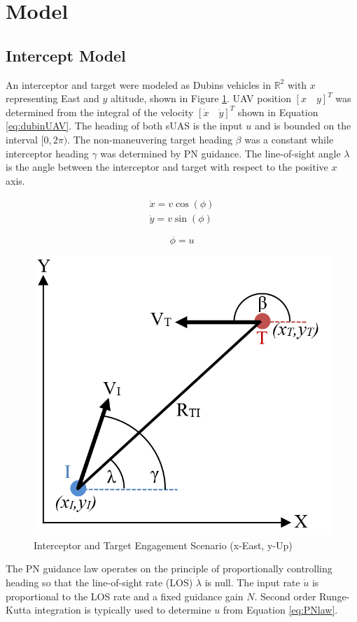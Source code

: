 \documentclass[conference]{IEEEtran}
\begin{document}
\section{Model}

\subsection{Intercept Model}
An interceptor and target were modeled as Dubins vehicles in $\mathbb{R}^2$ with $x$ representing East and $y$ altitude, shown in Figure \ref{fig:Egagement}. UAV position $[x \quad y]^T$ was determined from the integral of the velocity $[\dot{x} \quad \dot{y}]^T$ shown in Equation \ref{eq:dubinUAV}. The heading of both sUAS is the input $u$ and is bounded on the interval $[0,2\pi)$. The non-maneuvering target heading $\beta$ was a constant while interceptor heading $\gamma$ was determined by PN guidance. The line-of-sight angle $\lambda$ is the angle between the interceptor and target with respect to the positive $x$ axis. 



\begin{equation} \label{eq:dubinUAV}
\begin{split}
\dot{x} = v\cos(\phi)\\
\dot{y} = v\sin(\phi)
\end{split}
\end{equation}

\begin{equation}\label{eq:dubinsVel}
\phi = u
\end{equation}
 

\begin{figure}[H]
	\centering
	\includegraphics[width=6 cm]{Engagement_Model.PNG}
	\caption{Interceptor and Target Engagement Scenario (x-East, y-Up)}
	\label{fig:Egagement}
\end{figure}

The PN guidance law operates on the principle of proportionally controlling heading so that the line-of-sight rate (LOS) $\dot{\lambda}$ is null. The input rate $\dot{u}$ is proportional to the LOS rate and a fixed guidance gain $N$. Second order Runge-Kutta integration is typically used to determine $u$ from Equation \ref{eq:PNlaw}.
\end{document}

